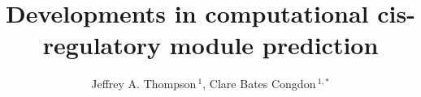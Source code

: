 \documentclass{frontiersENG} %
\def\firstAuthorLast{Thompson {et~al.}} %
\def\Authors{Jeffrey A. Thompson\,$^{1}$, Clare Bates Congdon\,$^{1,*}$}
\begin{document}
\onecolumn
{}

\title[Developments in comptutational CRM prediction]{Developments in computational cis-regulatory module prediction}
\author[\firstAuthorLast ]{\Authors}
\address{}
\correspondance{}
\extraAuth{}%
\topic{}%

\maketitle

\end{document}
